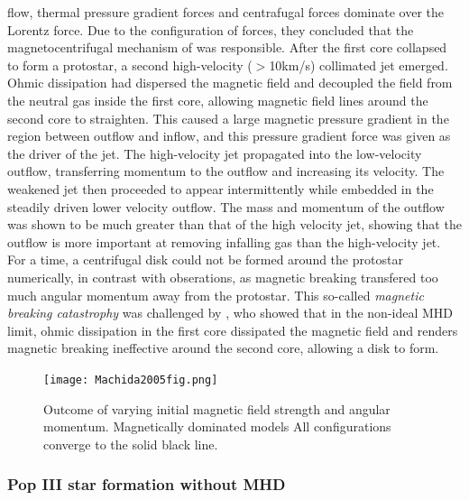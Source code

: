 \documentclass[11pt]{article}
\begin{document}
flow, thermal pressure gradient forces and centrafugal forces dominate over the Lorentz force. Due to the configuration of forces, they concluded that the magnetocentrifugal mechanism of \cite{Blandford1982} was responsible. After the first core collapsed to form a protostar, a second high-velocity ($>$10km/s) collimated jet emerged. Ohmic dissipation had dispersed the magnetic field and decoupled the field from the neutral gas inside the first core, allowing magnetic field lines around the second core to straighten. This caused a large magnetic pressure gradient in the region between outflow and inflow, and this pressure gradient force was given as the driver of the jet. The high-velocity jet propagated into the low-velocity outflow, transferring momentum to the outflow and increasing its velocity. The weakened jet then proceeded to appear intermittently while embedded in the steadily driven lower velocity outflow. The mass and momentum of the outflow was shown to be much greater than that of the high velocity jet, showing that the outflow is more important at removing infalling gas than the high-velocity jet. For a time, a centrifugal disk could not be formed around the protostar numerically, in contrast with obserations, as magnetic breaking transfered too much angular momentum away from the protostar. This so-called \emph{magnetic breaking catastrophy} was challenged by \cite{Basu2010}, who showed that in the non-ideal MHD limit, ohmic dissipation in the first core dissipated the magnetic field and renders magnetic breaking ineffective around the second core, allowing a disk to form. 



\begin{figure}[!htb]
         \centering
		\texttt{[image: Machida2005fig.png]}
		\caption{Outcome of varying initial magnetic field strength and angular momentum. Magnetically dominated models All configurations converge to the solid black line. \citep{Machida2005}}
		\label{fig:Machida2005}
\end{figure}

\subsubsection{Pop III star formation without MHD}
\label{sub:popIII}
\end{document}
